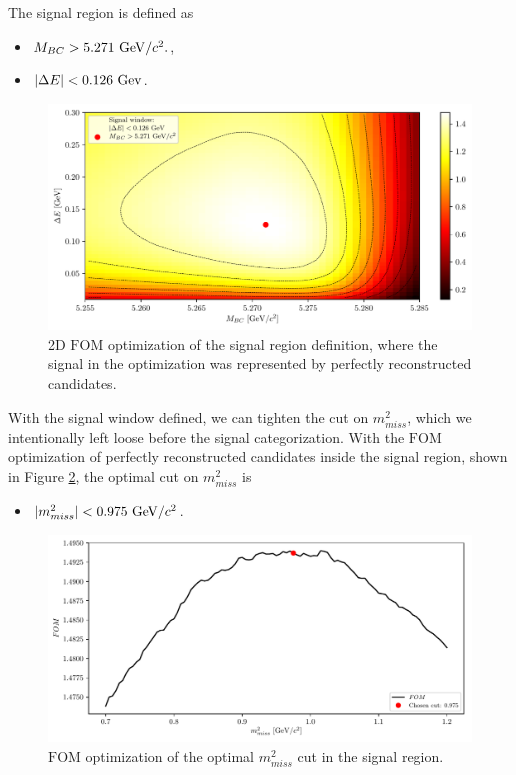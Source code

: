 The signal region is defined as
\begin{itemize}
	\item $M_{BC} > 5.271\mathrm{~GeV}/c^2.$,
	\item $\vert \Delta E \vert < 0.126\mathrm{~Gev}$. 
\end{itemize}

\begin{figure}[!htb]
	\centering
	\captionsetup{width=0.8\linewidth}
	\includegraphics[width=\linewidth]{fig/sigWin}
	\caption{2D $\mathrm{FOM}$ optimization of the signal region definition, where the signal in the optimization was represented by perfectly reconstructed candidates.}
	\label{fig:sigwin}
\end{figure}

With the signal window defined, we can tighten the cut on $m_{miss}^2$, which we intentionally left loose before the signal categorization. With the $\mathrm{FOM}$ optimization of perfectly reconstructed candidates inside the signal region, shown in Figure \ref{fig:missm2opt}, the optimal cut on $m_{miss}^2$ is 

\begin{itemize}
	\item $\vert m_{miss}^2 \vert < 0.975\mathrm{~GeV}/c^2$.
\end{itemize}

\begin{figure}[!htb]
	\centering
	\captionsetup{width=0.8\linewidth}
	\includegraphics[width=\linewidth]{fig/missM2_precise}
	\caption{$\mathrm{FOM}$ optimization of the optimal $m_{miss}^2$ cut in the signal region.}
	\label{fig:missm2opt}
\end{figure}

